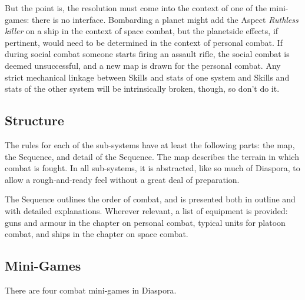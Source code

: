 But the point is, the resolution must come into the context of one of the mini-games: there is no interface. Bombarding a planet might add the Aspect \emph{Ruthless killer} on a ship in the context of space combat, but the planetside effects, if pertinent, would need to be determined in the context of personal combat. If during social combat someone starts firing an assault rifle, the social combat is deemed unsuccessful, and a new map is drawn for the personal combat. Any strict mechanical linkage between Skills and stats of one system and Skills and stats of the other system will be intrinsically broken, though, so don't do it.

\subsection{Structure}\label{sec:Structure} %

The rules for each of the sub-systems have at least the following parts: the map, the Sequence, and detail of the Sequence. The map describes the terrain in which combat is fought. In all sub-systems, it is abstracted, like so much of Diaspora, to allow a rough-and-ready feel without a great deal of preparation.

The Sequence outlines the order of combat, and is presented both in outline and with detailed explanations. Wherever relevant, a list of equipment is provided: guns and armour in the chapter on personal combat, typical units for platoon combat, and ships in the chapter on space combat.

\subsection{Mini-Games}\label{sec:Mini-Games} %

There are four combat mini-games in Diaspora.

